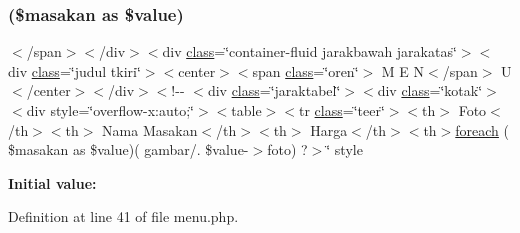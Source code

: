\subsubsection{\texorpdfstring{(\$masakan as \$value)}{($masakan as $value)}}
{\footnotesize\ttfamily $<$/span$>$$<$/div$>$$<$div \mbox{\hyperlink{waiter_2olaporan_8php_a185c73c6507391d1eb38c776b68ce96d}{class}}=\char`\"{}container-\/fluid jarakbawah jarakatas\char`\"{}$>$$<$div \mbox{\hyperlink{waiter_2olaporan_8php_a185c73c6507391d1eb38c776b68ce96d}{class}}=\char`\"{}judul tkiri\char`\"{}$>$$<$center$>$$<$span \mbox{\hyperlink{waiter_2olaporan_8php_a185c73c6507391d1eb38c776b68ce96d}{class}}=\char`\"{}oren\char`\"{}$>$ M E N$<$/span$>$ U$<$/center$>$$<$/div$>$$<$!-\/-\/ $<$div \mbox{\hyperlink{waiter_2olaporan_8php_a185c73c6507391d1eb38c776b68ce96d}{class}}=\char`\"{}jaraktabel\char`\"{}$>$$<$div \mbox{\hyperlink{waiter_2olaporan_8php_a185c73c6507391d1eb38c776b68ce96d}{class}}=\char`\"{}kotak\char`\"{}$>$$<$div style=\char`\"{}overflow-\/x\+:auto;\char`\"{}$>$$<$table$>$$<$tr \mbox{\hyperlink{waiter_2olaporan_8php_a185c73c6507391d1eb38c776b68ce96d}{class}}=\char`\"{}teer\char`\"{}$>$$<$th$>$ Foto$<$/th$>$$<$th$>$ Nama Masakan$<$/th$>$$<$th$>$ Harga$<$/th$>$$<$th$>$\mbox{\hyperlink{pdetailorder_8php_a2e23c42e9b59be6e2bbc1bac76422d34}{foreach}} ( \$masakan as \$value)( \textquotesingle{}gambar/\textquotesingle{}. \$value-\/$>$foto) ?$>$\char`\"{} style}

{\bfseries Initial value\+:}
\begin{DoxyCode}{0}

\end{DoxyCode}


Definition at line 41 of file menu.\+php.

